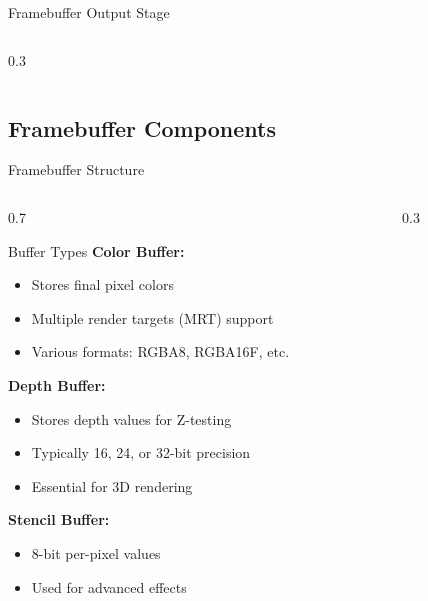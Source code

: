 \begin{frame}{Framebuffer Output Stage}
\begin{columns}
\begin{column}{0.3\textwidth}
    \end{column}
  \end{columns}
\end{frame}

\subsection{Framebuffer Components}
\begin{frame}{Framebuffer Structure}
  \footnotesize
  \begin{columns}
    \begin{column}{0.7\textwidth}
      \begin{conceptbox}{Buffer Types}
        \textbf{Color Buffer:}
        \begin{itemize}
          \item Stores final pixel colors
          \item Multiple render targets (MRT) support
          \item Various formats: RGBA8, RGBA16F, etc.
        \end{itemize}

        \textbf{Depth Buffer:}
        \begin{itemize}
          \item Stores depth values for Z-testing
          \item Typically 16, 24, or 32-bit precision
          \item Essential for 3D rendering
        \end{itemize}

        \textbf{Stencil Buffer:}
        \begin{itemize}
          \item 8-bit per-pixel values
          \item Used for advanced effects
        \end{itemize}
      \end{conceptbox}
    \end{column}
    \begin{column}{0.3\textwidth}
\end{column}
\end{columns}
\end{frame}
